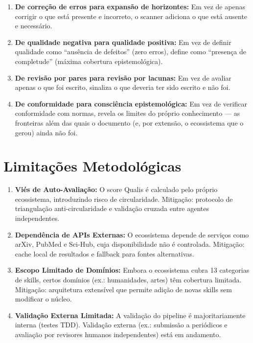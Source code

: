 \begin{enumerate}
  \item \textbf{De correção de erros para expansão de horizontes:} Em vez de apenas corrigir o que está presente e incorreto, o scanner adiciona o que está ausente e necessário.
  \item \textbf{De qualidade negativa para qualidade positiva:} Em vez de definir qualidade como ``ausência de defeitos'' (zero erros), define como ``presença de completude'' (máxima cobertura epistemológica).
  \item \textbf{De revisão por pares para revisão por lacunas:} Em vez de avaliar apenas o que foi escrito, sinaliza o que deveria ter sido escrito e não foi.
  \item \textbf{De conformidade para consciência epistemológica:} Em vez de verificar conformidade com normas, revela os limites do próprio conhecimento --- as fronteiras além das quais o documento (e, por extensão, o ecossistema que o gerou) ainda não foi.
\end{enumerate}

\section{Limitações Metodológicas}

\begin{enumerate}
  \item \textbf{Viés de Auto-Avaliação:} O score Qualis é calculado pelo próprio ecossistema, introduzindo risco de circularidade. Mitigação: protocolo de triangulação anti-circularidade e validação cruzada entre agentes independentes.
  \item \textbf{Dependência de APIs Externas:} O ecossistema depende de serviços como arXiv, PubMed e Sci-Hub, cuja disponibilidade não é controlada. Mitigação: cache local de resultados e fallback para fontes alternativas.
  \item \textbf{Escopo Limitado de Domínios:} Embora o ecossistema cubra 13 categorias de skills, certos domínios (ex.: humanidades, artes) têm cobertura limitada. Mitigação: arquitetura extensível que permite adição de novas skills sem modificar o núcleo.
  \item \textbf{Validação Externa Limitada:} A validação do pipeline é majoritariamente interna (testes TDD). Validação externa (ex.: submissão a periódicos e avaliação por revisores humanos independentes) está em andamento.
\end{enumerate}

\newpage
